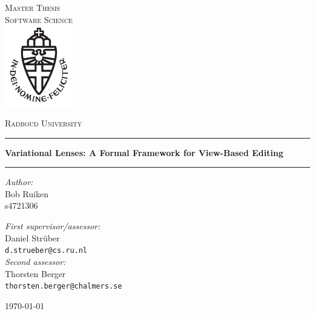 \documentclass[11pt,a4paper]{report}
\theoremstyle{definition}
\begin{document}
\begin{titlepage}
\begin{center}
\textsc{\LARGE Master Thesis\\Software Science}\\[1.5cm]
\includegraphics[height=100pt]{logo}

\vspace{0.4cm}
\textsc{\Large Radboud University}\\[1cm]
\hrule
\vspace{0.4cm}
\textbf{\Large Variational Lenses: A Formal Framework for View-Based Editing}\\[0.4cm]
\hrule
\vspace{2cm}
\begin{minipage}[t]{0.45\textwidth}
\begin{flushleft} \large
\textit{Author:}\\
Bob Ruiken\\
s4721306
\end{flushleft}
\end{minipage}
\begin{minipage}[t]{0.48\textwidth}
\begin{flushright} \large
\textit{First supervisor/assessor:}\\
Daniel Str{\"u}ber\\
\texttt{d.strueber@cs.ru.nl}\\[1.3cm]
\textit{Second assessor:}\\
Thorsten Berger\\
\texttt{thorsten.berger@chalmers.se}
\end{flushright}
\end{minipage}
\vfill
{\large \today}
\end{center}
\end{titlepage}





\setcounter{tocdepth}{1}
\tableofcontents
\newpage
\listoffigures
\newpage

\setlength{\parskip}{10pt}












\end{document}
